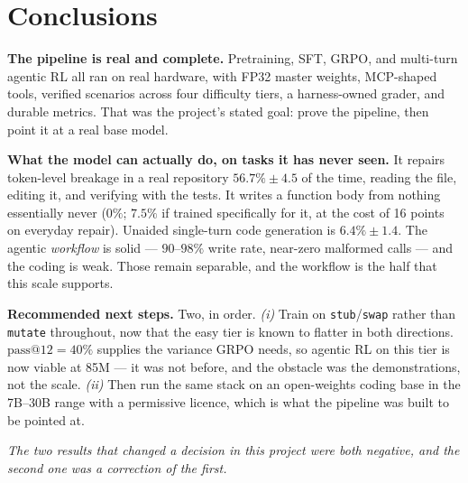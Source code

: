 \documentclass[10pt,a4paper]{article}
\newcommand{\code}[1]{\texttt{\small #1}}
\begin{document}
\section{Conclusions}

\textbf{The pipeline is real and complete.} Pretraining, SFT, GRPO, and
multi-turn agentic RL all ran on real hardware, with FP32 master weights,
MCP-shaped tools, verified scenarios across four difficulty tiers, a
harness-owned grader, and durable metrics. That was the project's stated goal:
prove the pipeline, then point it at a real base model.

\medskip\noindent\textbf{What the model can actually do, on tasks it has never
seen.} It repairs token-level breakage in a real repository $56.7\% \pm 4.5$ of
the time, reading the file, editing it, and verifying with the tests. It writes
a function body from nothing essentially never ($0\%$; $7.5\%$ if trained
specifically for it, at the cost of 16 points on everyday repair). Unaided
single-turn code generation is $6.4\% \pm 1.4$. The agentic \emph{workflow} is
solid --- $90$--$98\%$ write rate, near-zero malformed calls --- and the coding
is weak. Those remain separable, and the workflow is the half that this scale
supports.

\medskip\noindent\textbf{Recommended next steps.} Two, in order.
\emph{(i)} Train on \code{stub}/\code{swap} rather than \code{mutate}
throughout, now that the easy tier is known to flatter in both directions.
$\mathrm{pass@}12 = 40\%$ supplies the variance GRPO needs, so agentic RL on
this tier is now viable at 85M --- it was not before, and the obstacle was the
demonstrations, not the scale. \emph{(ii)} Then run the same stack on an
open-weights coding base in the 7B--30B range with a permissive licence, which
is what the pipeline was built to be pointed at.

\medskip
\begin{center}
\small\color{ink}\itshape
The two results that changed a decision in this project were both negative,
and the second one was a correction of the first.
\end{center}
\end{document}
